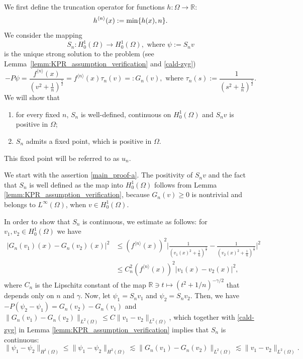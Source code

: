 \documentclass[12pt,a4paper]{amsart}
\theoremstyle{definition}
\newcommand{\R}{\mathbb{R}}
\begin{document}
We first define the truncation operator for functions $h\colon \Omega\to \R$:
$$
h^{{\langle n \rangle}}(x):= {\rm min}\{ h(x),n\} .
$$ We consider
 the mapping $$S_n\colon H^1_0(\Omega)\to H^1_0(\Omega), \text { where } \psi:=S_nv$$
 is the unique strong solution to the problem (see Lemma~\ref{lemm:KPR_assumption_verification} and \eqref{cald-zyg})
\begin{equation}\label{rownanie}
-P\psi= \frac{f^{{\langle n \rangle}}(x) }{(v^2+\frac{1}{n})^{\frac{\gamma}{2}}} = f^{{\langle n \rangle}}(x)\tau_n (v)=: G_{n}(v), \text{ where } \tau_n (s):= \frac{1}{(s^2+\frac{1}{n})^{\frac{\gamma }{2}}}.
\end{equation}
We will show that
\begin{enumerate}[label={\textup{(\alph*)}}]
    \item \label{main_proof-a} for every fixed $n$, $S_{n}$ is well-defined, continuous on $H^1_0(\Omega)$ and $S_n v$ is positive in $\Omega$;
    \item \label{main_proof-b} $S_n$ admits a fixed point, which is positive in $\Omega$. 
\end{enumerate}

This fixed point will be referred to as $u_n$.

We start with the assertion \ref{main_proof-a}.
The positivity of $S_nv$ and the fact that $S_n$ is well defined as the map into $H^1_0(\Omega)$
follows from Lemma \ref{lemm:KPR_assumption_verification}, because $G_n(v)\geq 0$ is nontrivial and belongs to $L^\infty(\Omega)$, when $v\in H^1_0(\Omega)$. 


In order to show that $S_n$ is continuous, we estimate as follows: for $v_1,v_2\in H^1_0(\Omega)$ we have
\begin{align*}
    |G_n(v_1)(x) - G_n(v_2)(x)|^2 &\leq (f^{{\langle n \rangle}}(x))^2\bigg|\frac{1}{(v_1(x)^2 + \tfrac 1n)^{\frac \gamma 2}} - \frac{1}{(v_2(x)^2 + \tfrac 1n)^{\frac \gamma 2}}\bigg|^2\\
    &\leq C_n^2(f^{{\langle n \rangle}}(x))^2 |v_1(x) - v_2(x)|^2,  
\end{align*}
where $C_n$ is the Lipschitz constant of the map $\R \ni t\mapsto (t^2 + 1/n)^{-\gamma/2}$ that depends only on $n$ and $\gamma$. Now, let $\psi_1 = S_n v_1$ and $\psi_2 = S_n v_2$. Then, we have $-P(\psi_2-\psi_1)= G_n(v_2)- G_n(v_1)$ and 
$\|G_n(v_1) -G_n(v_2)\|_{L^2(\Omega)} \leq C \|v_1 - v_2\|_{L^2(\Omega)}$, which together with \eqref{cald-zyg} in
Lemma \ref{lemm:KPR_assumption_verification} implies that $S_n$ is continuous:
\begin{equation*}
    \|\psi_1 - \psi_2 \|_{H^1(\Omega)}\leq\|\psi_1 - \psi_2\|_{H^2(\Omega)} \lesssim \|G_n(v_1) -G_n(v_2)\|_{L^2(\Omega)} \lesssim \|v_1 - v_2\|_{L^2(\Omega)}.
\end{equation*}
\end{document}
